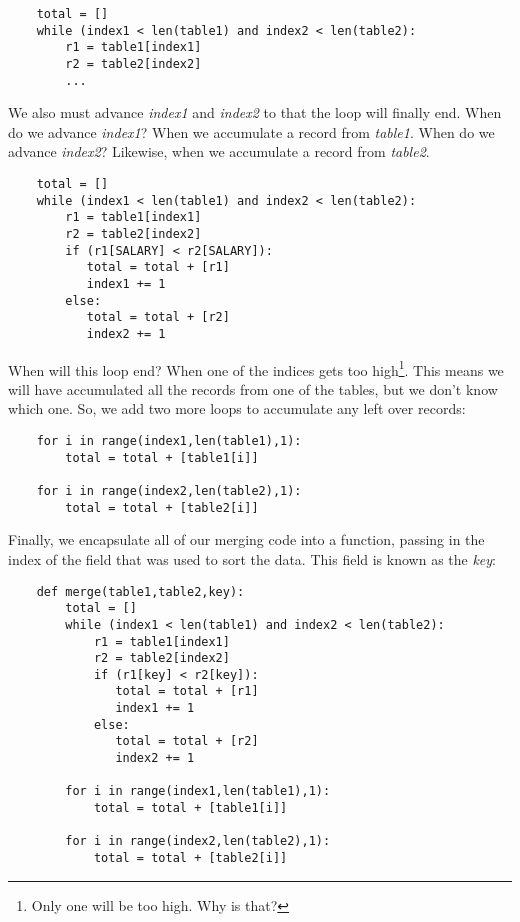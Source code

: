 \begin{verbatim}
    total = []
    while (index1 < len(table1) and index2 < len(table2):
        r1 = table1[index1]
        r2 = table2[index2]
        ...
\end{verbatim}

We also must advance {\it index1} and {\it index2} to that the loop will
finally end. When do we advance {\it index1}? When we accumulate
a record from {\it table1}. When do we advance {\it index2}? Likewise,
when we accumulate a record from {\it table2}.


\begin{verbatim}
    total = []
    while (index1 < len(table1) and index2 < len(table2):
        r1 = table1[index1]
        r2 = table2[index2]
        if (r1[SALARY] < r2[SALARY]):
           total = total + [r1]
           index1 += 1
        else:
           total = total + [r2]
           index2 += 1
\end{verbatim}

When will this loop end? When one of the indices gets too high\footnote{
Only one will be too high. Why is that?}.
This means we will have accumulated all the
records from one of the tables, but we don't know which one.
So, we add two more loops to accumulate any left over records:

\begin{verbatim}
    for i in range(index1,len(table1),1):
        total = total + [table1[i]]

    for i in range(index2,len(table2),1):
        total = total + [table2[i]]
\end{verbatim}

Finally, we encapsulate all of our merging code into
a function, passing in the index of the field that was
used to sort the data. This field is
known as the {\it key}:

\begin{verbatim}
    def merge(table1,table2,key):
        total = []
        while (index1 < len(table1) and index2 < len(table2):
            r1 = table1[index1]
            r2 = table2[index2]
            if (r1[key] < r2[key]):
               total = total + [r1]
               index1 += 1
            else:
               total = total + [r2]
               index2 += 1

        for i in range(index1,len(table1),1):
            total = total + [table1[i]]

        for i in range(index2,len(table2),1):
            total = total + [table2[i]]
\end{verbatim}

